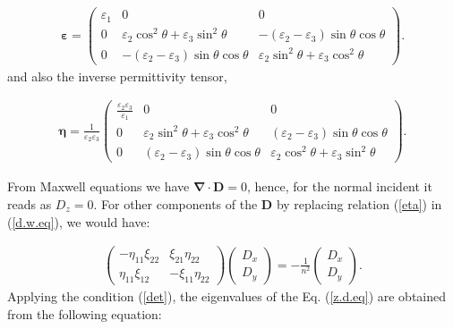 \documentclass[9pt,twocolumn,twoside]{osajnl}
\begin{document}
\begin{align}\label{eps}
        \boldsymbol{\varepsilon}=
        \begin{pmatrix}
             \varepsilon_{1} &0 &0 \\
            0&\varepsilon_{2} \cos^{2}{\theta} + \varepsilon_{3}\sin^{2}{\theta}   &-(\varepsilon_{2}-\varepsilon_{3})\sin{\theta}\cos{\theta} \\
            0&-(\varepsilon_{2}-\varepsilon_{3})\sin{\theta}\cos{\theta} &\varepsilon_{2} \sin^{2}{\theta} + \varepsilon_{3}\cos^{2}{\theta}
        \end{pmatrix}.
\end{align}
and also the inverse permittivity tensor,

\begin{align}\label{eta}
        \boldsymbol{\eta}= \frac{1}{\varepsilon_{2} \varepsilon_{3}}
        \begin{pmatrix}
            \frac{\varepsilon_{2} \varepsilon_{3}}{\varepsilon_{1}}& 0  &0 \\
            0&\varepsilon_{2} \sin^{2}{\theta} + \varepsilon_{3}\cos^{2}{\theta}   & (\varepsilon_{2}-\varepsilon_{3})\sin{ \theta} \cos {\theta} \\
            0& (\varepsilon_{2}-\varepsilon_{3})\sin{\theta}\cos{\theta} &\varepsilon_{2} \cos^{2}{\theta} + \varepsilon_{3}\sin^{2}{\theta}
        \end{pmatrix}.
\end{align}

From Maxwell equations we have $\boldsymbol{\nabla}\cdot \mathbf{D}=0$, hence, for  the normal incident it reads as ${D}_{z}=0$.  
For other components of the $\mathbf{D}$ by replacing relation (\ref{eta}) in (\ref{d.w.eq}), we would have:

\begin{eqnarray}\label{z.d.eq}
        \begin{pmatrix}
            - \eta_{11} \xi_{22}  & \xi_{21}\eta_{22} \\
             \eta_{11} \xi_{12}& -\xi_{11}\eta_{22}
        \end{pmatrix}
        \begin{pmatrix}
            D_{x} \\ D_{y}
        \end{pmatrix}
        = -\frac{1}{n^{2}}
        \begin{pmatrix}
            D_{x} \\ D_{y}
        \end{pmatrix}.
\end{eqnarray}
Applying the condition (\ref{det}), the eigenvalues of the Eq. (\ref{z.d.eq}) are obtained from the following equation:
\end{document}
